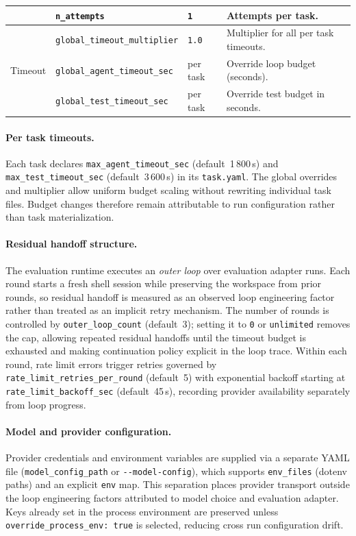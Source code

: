 \begin{table}[!htb]
{\begin{tabular}{@{}l l l p{6.5cm}@{}}
      & \texttt{n\_attempts} & \texttt{1} & Attempts per task. \\
    \midrule
    \multirow{3}{*}{Timeout}
      & \texttt{global\_timeout\_multiplier} & \texttt{1.0} & Multiplier for all per task timeouts. \\
      & \texttt{global\_agent\_timeout\_sec} & per task     & Override loop budget (seconds). \\
      & \texttt{global\_test\_timeout\_sec} & per task     & Override test budget in seconds. \\
    \bottomrule
  \end{tabular}}
\end{table}

\paragraph{Per task timeouts.}
Each task declares \texttt{max\_agent\_timeout\_sec} (default~1\,800\,s) and \texttt{max\_test\_timeout\_sec} (default~3\,600\,s) in its \texttt{task.yaml}.
The global overrides and multiplier allow uniform budget scaling without rewriting individual task files. Budget changes therefore remain attributable to run configuration rather than task materialization.

\paragraph{Residual handoff structure.}
The evaluation runtime executes an \emph{outer loop} over evaluation adapter runs. Each round starts a fresh shell session while preserving the workspace from prior rounds, so residual handoff is measured as an observed loop engineering factor rather than treated as an implicit retry mechanism.
The number of rounds is controlled by \texttt{outer\_loop\_count} (default~3); setting it to \texttt{0} or \texttt{unlimited} removes the cap, allowing repeated residual handoffs until the timeout budget is exhausted and making continuation policy explicit in the loop trace.
Within each round, rate limit errors trigger retries governed by \texttt{rate\_limit\_retries\_per\_round} (default~5) with exponential backoff starting at \texttt{rate\_limit\_backoff\_sec} (default~45\,s), recording provider availability separately from loop progress.

\paragraph{Model and provider configuration.}
Provider credentials and environment variables are supplied via a separate YAML file (\texttt{model\_config\_path} or \texttt{-{}-model-config}), which supports \texttt{env\_files} (dotenv paths) and an explicit \texttt{env} map. This separation places provider transport outside the loop engineering factors attributed to model choice and evaluation adapter.
Keys already set in the process environment are preserved unless \texttt{override\_process\_env:\allowbreak{} true} is selected, reducing cross run configuration drift.

